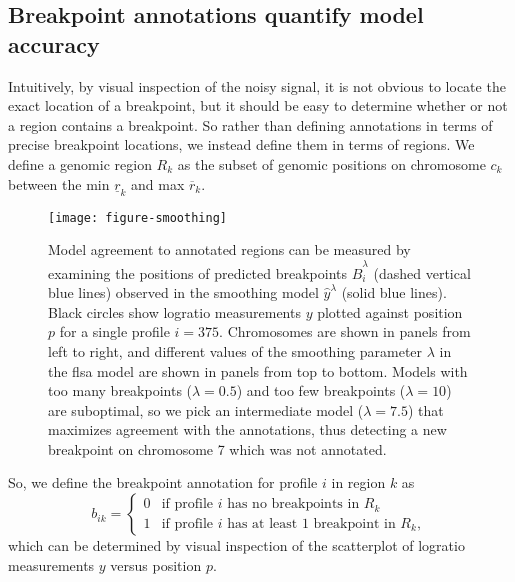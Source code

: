 \documentclass{bioinfo}
\newcommand{\model}[1]{#1}
\newcommand{\NN}{\mathbb N}
\begin{document}
\begin{methods}
\subsection{Breakpoint annotations quantify model accuracy}

Intuitively, by visual inspection of the noisy signal, it is not
obvious to locate the exact location of a breakpoint, but it should be
easy to determine whether or not a region contains a breakpoint.
So rather than defining annotations in terms of precise breakpoint
locations, we instead define them in terms of regions. We define a
genomic region $R_k$ as
the subset of genomic positions on chromosome $c_k$ between the min
$\underline r_k$ and max $\overline r_k$. 

\begin{figure*}
\texttt{[image: figure-smoothing]}
\caption{\label{figure-smoothing}Model agreement to annotated
   regions can be measured by examining the positions of
  predicted breakpoints $\hat B_{i}^\lambda$ (dashed vertical blue
  lines) observed in the smoothing model $\hat y^\lambda$ (solid
  blue lines). 
  Black circles show 
  logratio measurements $y$ plotted against
  position $p$ 
  for a single profile
  $i=375$. Chromosomes are shown in panels from
  left to right, and different values of the smoothing parameter
  $\lambda$ in the \model{flsa} model are shown in panels from top to
  bottom. Models with too many breakpoints ($\lambda=0.5$) and too few
  breakpoints ($\lambda=10$) are suboptimal, so we pick an
  intermediate model ($\lambda=7.5$) that maximizes agreement with
  the annotations, thus detecting a new breakpoint on chromosome 7
  which was not annotated.}
\end{figure*}

So, we define the breakpoint annotation for profile $i$ in region
$k$ as
\begin{equation}
  \label{eq:bik}
  b_{ik}=
  \begin{cases}
    0 & \text{if profile $i$ has no breakpoints in $R_k$}\\
    1 & \text{if profile $i$ has at least 1 breakpoint in $R_k$},
  \end{cases}
\end{equation}
which can be determined by visual inspection of the scatterplot of
logratio measurements $y$ versus position $p$.


\end{methods}
\end{document}
